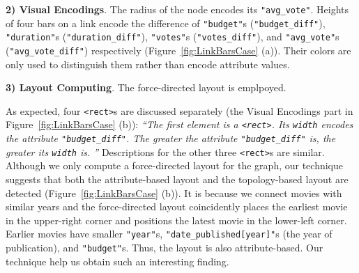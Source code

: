 \textbf{2) Visual Encodings}.
The radius of the node encodes its \texttt{"avg\_vote"}.
Heights of four bars on a link encode the difference of \texttt{"budget"}s (\texttt{"budget\_diff"}), \texttt{"duration"}s (\texttt{"duration\_diff"}), \texttt{"votes"}s (\texttt{"votes\_diff"}), and \texttt{"avg\_vote"}s (\texttt{"avg\_vote\_diff"}) respectively (Figure~\ref{fig:LinkBarsCase} (a)).
Their colors are only used to distinguish them rather than encode attribute values.

\textbf{3) Layout Computing}.
The force-directed layout is emplpoyed.

As expected, four \texttt{<rect>}s are discussed separately (the Visual Encodings part in Figure~\ref{fig:LinkBarsCase} (b)):
\textit{``The first element is a \texttt{<rect>}. Its \texttt{width} encodes the attribute \texttt{"budget\_diff"}. The greater the attribute \texttt{"budget\_diff"} is, the greater its \texttt{width} is.
''}
Descriptions for the other three \texttt{<rect>}s are similar.
Although we only compute a force-directed layout for the graph, our technique suggests that both the attribute-based layout and the topology-based layout are detected (Figure~\ref{fig:LinkBarsCase} (b)).
It is because we connect movies with similar years and the force-directed layout coincidently places the earliest movie in the upper-right corner and positions the latest movie in the lower-left corner.
Earlier movies have smaller \texttt{"year"}s, \texttt{"date\_published[year]"}s (the year of publication), and \texttt{"budget"}s.
Thus, the layout is also attribute-based.
Our technique help us obtain such an interesting finding.